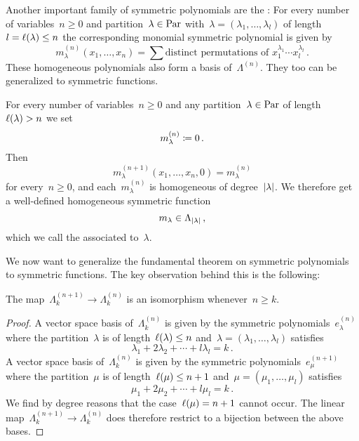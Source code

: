 \documentclass[a4paper,11pt]{scrartcl}
\begin{document}
Another important family of symmetric polynomials are the :
For every number of variables~$n \geq 0$ and partition~$\lambda \in \mathrm{Par}$ with~$\lambda = (\lambda_1, \dotsc, \lambda_l)$ of length~$l = \ell(\lambda) \leq n$ the corresponding monomial symmetric polynomial is given by
\[
  m^{(n)}_\lambda(x_1, \dotsc, x_n)
  =
  \sum \text{distinct permutations of~$x_1^{\lambda_1} \dotsm x_l^{\lambda_l}$} \,.
\]
These homogeneous polynomials also form a basis of~$\Lambda^{(n)}$.
They too can be generalized to symmetric functions.

\begin{example}
  For every number of variables~$n \geq 0$ and any partition~$\lambda \in \mathrm{Par}$ of length~$\ell(\lambda) > n$ we set
  \[
    m^{(n)}_\lambda \coloneqq 0 \,.
  \]
  Then
  \[
    m^{(n+1)}_\lambda(x_1, \dotsc, x_n, 0)
    =
    m^{(n)}_\lambda
  \]
  for every~$n \geq 0$, and each~$m_\lambda^{(n)}$ is homogeneous of degree~$\lvert\lambda\rvert$.
  We therefore get a well-defined homogeneous symmetric function
  \[
    m_\lambda
    \in
    \Lambda_{\lvert\lambda\rvert} \,,
  \]
  which we call the  associated to~$\lambda$.
\end{example}

We now want to generalize the fundamental theorem on symmetric polynomials to symmetric functions.
The key observation behind this is the following:

\begin{proposition}
  \label{sequence stabilizes}
  The map~$\Lambda^{(n+1)}_k \to \Lambda^{(n)}_k$ is an isomorphism whenever~$n \geq k$. 
\end{proposition}

\begin{proof}
  A vector space basis of~$\Lambda^{(n)}_k$ is given by the symmetric polynomials~$e^{(n)}_\lambda$ where the partition~$\lambda$ is of length~$\ell(\lambda) \leq n$ and~$\lambda = (\lambda_1, \dotsc, \lambda_l)$ satisfies
  \[
    \lambda_1 + 2 \lambda_2 + \dotsb + l \lambda_l = k \,.
  \]
  A vector space basis of~$\Lambda^{(n)}_k$ is given by the symmetric polynomials~$e^{(n+1)}_\mu$ where the partition~$\mu$ is of length~$\ell(\mu) \leq n+1$ and~$\mu = (\mu_1, \dotsc, \mu_l)$ satisfies
  \[
    \mu_1 + 2 \mu_2 + \dotsb + l \mu_l = k \,.
  \]
  We find by degree reasons that the case~$\ell(\mu) = n+1$ cannot occur.
  The linear map~$\Lambda^{(n+1)}_k \to \Lambda^{(n)}_k$ does therefore restrict to a bijection between the above bases.
\end{proof}
\end{document}
